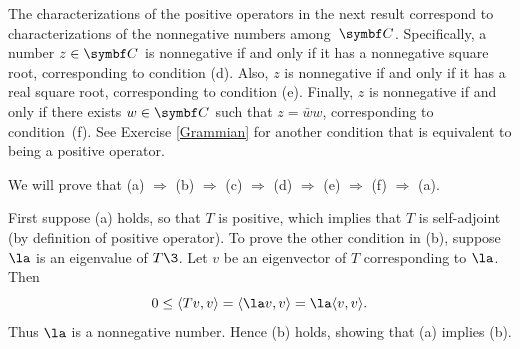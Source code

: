 
The characterizations of the positive operators in the next result correspond
to characterizations of the nonnegative numbers among~$\C{}$.  Specifically,
a number $z \in \C{}$ is nonnegative if and only if it has a nonnegative
square root, corresponding to condition (d).  Also, $z$ is nonnegative if
and only if it has a real square root, corresponding to condition (e).
Finally, $z$ is nonnegative if and only if there exists $w \in \C{}$ such that $z = \bar{w}w$,  corresponding to condition~(f). See Exercise \ref{Grammian} for another condition that is equivalent to being a positive operator.

\pagebreak[3]


\proof
We will prove that (a) $\Rightarrow$ (b)  $\Rightarrow$ (c)  $\Rightarrow$ (d)
$\Rightarrow$ (e) $\Rightarrow$ (f) $\Rightarrow$ (a).

First suppose (a) holds, so that $T$ is positive, which implies that $T$ is
self-adjoint (by definition of positive operator). To prove the
other  condition in (b), suppose $\la$ is an eigenvalue of $T\3$.  Let $v$ be an eigenvector of $T$ corresponding to $\la$.  Then
\[
0 \le \ip{Tv, v} = \ip{\la v, v} = \la \ip{v, v}.
\]
Thus $\la$ is a nonnegative number.  Hence (b) holds, showing that (a) implies (b).

